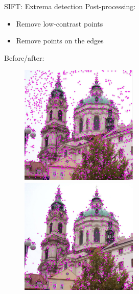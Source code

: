 \documentclass{beamer}
\newcommand{\1}[1]{\mathbbm{1}\left[#1\right]}
\begin{document}
\begin{frame}{SIFT: Extrema detection}
Post-processing:
\begin{itemize}
	\item Remove low-contrast points
	\item Remove points on the edges
\end{itemize}
\pause
\vfill
Before/after:
\begin{figure}
\centering
\includegraphics[width=0.5\textwidth]{images/sift_all_points.png}~
\includegraphics[width=0.5\textwidth]{images/sift_interest_points.png}
\end{figure}
\end{frame}
\end{document}
